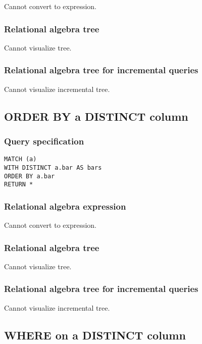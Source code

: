 Cannot convert to expression.

\subsubsection*{Relational algebra tree}

Cannot visualize tree.

\subsubsection*{Relational algebra tree for incremental queries}

Cannot visualize incremental tree.

\subsection{ORDER BY a DISTINCT column}

\subsubsection*{Query specification}

\begin{lstlisting}
MATCH (a)
WITH DISTINCT a.bar AS bars
ORDER BY a.bar
RETURN *
\end{lstlisting}

\subsubsection*{Relational algebra expression}

Cannot convert to expression.

\subsubsection*{Relational algebra tree}

Cannot visualize tree.

\subsubsection*{Relational algebra tree for incremental queries}

Cannot visualize incremental tree.

\subsection{WHERE on a DISTINCT column}

